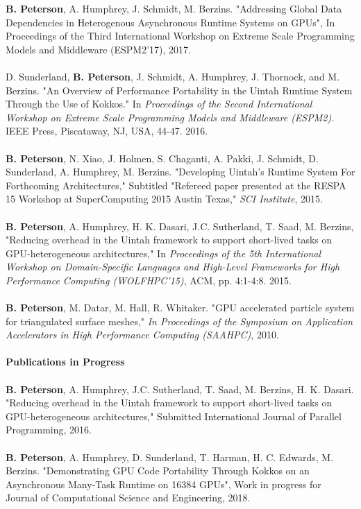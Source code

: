 \documentclass[12pt]{article}
\begin{document}
\textbf{B. Peterson}, A. Humphrey, J. Schmidt, M. Berzins.  "Addressing Global Data Dependencies in Heterogenous Asynchronous Runtime Systems on GPUs", In {Proceedings of the Third International Workshop on Extreme Scale Programming Models and Middleware (ESPM2'17)}, 2017. \\
\\
D. Sunderland, \textbf{B. Peterson}, J. Schmidt, A. Humphrey, J. Thornock, and M. Berzins. "An Overview of Performance Portability in the Uintah Runtime System Through the Use of Kokkos."  In \textit{Proceedings of the Second International Workshop on Extreme Scale Programming Models and Middleware (ESPM2)}. IEEE Press, Piscataway, NJ, USA, 44-47. 2016.\\
\\
\textbf{B. Peterson}, N. Xiao, J. Holmen, S. Chaganti, A. Pakki, J. Schmidt, D. Sunderland, A. Humphrey, M. Berzins. "Developing Uintah's Runtime System For Forthcoming Architectures," Subtitled "Refereed paper presented at the RESPA 15 Workshop at SuperComputing 2015 Austin Texas," \textit{SCI Institute}, 2015.\\
\\
\textbf{B. Peterson}, A. Humphrey, H. K. Dasari, J.C. Sutherland, T. Saad, M. Berzins, "Reducing overhead in the Uintah framework to support short-lived tasks on GPU-heterogeneous architectures," In \textit{Proceedings of the 5th International Workshop on Domain-Specific Languages and High-Level Frameworks for High Performance Computing (WOLFHPC'15)}, ACM, pp. 4:1-4:8. 2015.\\
\\
\textbf{B. Peterson}, M. Datar, M. Hall, R. Whitaker.  "GPU accelerated particle system for triangulated surface meshes," \textit{In Proceedings of the Symposium on Application Accelerators in High Performance Computing (SAAHPC)}, 2010.\\
\\
\textbf{Publications in Progress}\\
\\
\textbf{B. Peterson},  A. Humphrey, J.C. Sutherland, T. Saad, M. Berzins, H. K. Dasari. "Reducing overhead in the Uintah framework to support short-lived tasks on GPU-heterogeneous architectures," Submitted International Journal of Parallel Programming, 2016.\\
\\
\textbf{B. Peterson}, A. Humphrey, D. Sunderland, T. Harman, H. C. Edwards, M. Berzins. "Demonstrating GPU Code Portability Through Kokkos on an Asynchronous Many-Task Runtime on 16384 GPUs",  Work in progress for Journal of Computational Science and Engineering, 2018.\\
\end{document}
